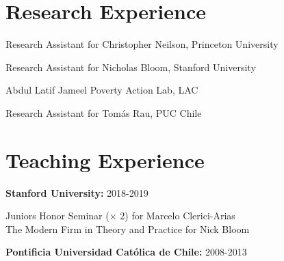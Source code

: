 \documentclass[margin,line]{res}
\begin{document}
\begin{resume}
\section{\sc Research Experience}

\begin{description}[style=multiline,leftmargin=2.2cm,font=\normalfont]
\item[2018]  Research Assistant for Christopher Neilson, Princeton University
\item[2017]  Research Assistant for Nicholas Bloom, Stanford University
\item[2013 - 2015]  Abdul Latif Jameel Poverty Action Lab, LAC 
\item[2014]  Research Assistant for Tom\'as Rau, PUC Chile
\end{description}
%

\section{\sc Teaching Experience}
{\bf Stanford University:} 2018-2019

\vspace{-.3cm}
Juniors Honor Seminar ($\times$ 2) for Marcelo Clerici-Arias\\
The Modern Firm in Theory and Practice for Nick Bloom

{\bf Pontificia Universidad Cat\'olica de Chile:} 2008-2013


\end{resume}
\end{document}
